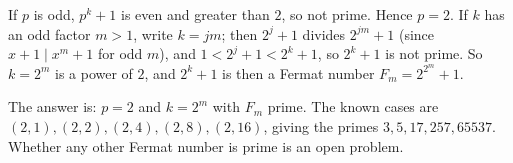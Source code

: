 If $p$ is odd, $p^k+1$ is even and greater than $2$, so not prime. Hence $p=2$. If $k$ has an odd factor $m>1$, write $k=jm$; then $2^j+1$ divides $2^{jm}+1$ (since $x+1\mid x^m+1$ for odd $m$), and $1<2^j+1<2^k+1$, so $2^k+1$ is not prime. So $k=2^m$ is a power of $2$, and $2^k+1$ is then a Fermat number $F_m=2^{2^m}+1$.

The answer is: $p=2$ and $k=2^m$ with $F_m$ prime. The known cases are $\boxed{(2,1),(2,2),(2,4),(2,8),(2,16)}$, giving the primes $3,5,17,257,65537$. Whether any other Fermat number is prime is an open problem.
